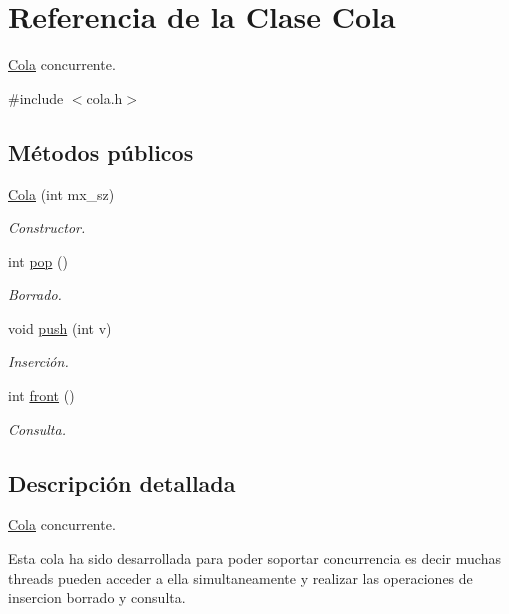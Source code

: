 \hypertarget{classCola}{
\section{\-Referencia de la \-Clase \-Cola}
\label{classCola}
}


\hyperlink{classCola}{\-Cola} concurrente.  




{\ttfamily \#include $<$cola.\-h$>$}

\subsection*{\-Métodos públicos}
\begin{DoxyCompactItemize}
\item 
\hyperlink{classCola_a47dd60bd45a0d7e7d63e0ed1df7242d6}{\-Cola} (int mx\-\_\-sz)
\begin{DoxyCompactList}\small\item\em \-Constructor. \end{DoxyCompactList}\item 
int \hyperlink{classCola_afa3f9050ac056af3c1684b09e0f5b3fd}{pop} ()
\begin{DoxyCompactList}\small\item\em \-Borrado. \end{DoxyCompactList}\item 
void \hyperlink{classCola_ac0fc2612f76c97cd8a1e474b1030f7b5}{push} (int v)
\begin{DoxyCompactList}\small\item\em \-Inserción. \end{DoxyCompactList}\item 
int \hyperlink{classCola_a120a39d6fcf73a0d9c3049c9288abb61}{front} ()
\begin{DoxyCompactList}\small\item\em \-Consulta. \end{DoxyCompactList}\end{DoxyCompactItemize}


\subsection{\-Descripción detallada}
\hyperlink{classCola}{\-Cola} concurrente. 

\-Esta cola ha sido desarrollada para poder soportar concurrencia es decir muchas threads pueden acceder a ella simultaneamente y realizar las operaciones de insercion borrado y consulta.


